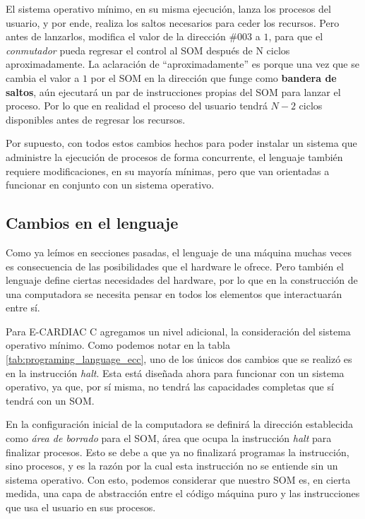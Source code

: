 \documentclass[letterpaper,12pt,oneside]{book}
\begin{document}
		El sistema operativo mínimo, en su misma ejecución, lanza los procesos del usuario, y por ende, realiza los saltos necesarios para ceder los recursos. Pero antes de lanzarlos,		
		modifica el valor de la dirección $\#003$ a $1$, para que el \textit{conmutador} pueda regresar el control al SOM después de N ciclos aproximadamente. La aclaración de ``aproximadamente'' es porque
		una vez que se cambia el valor a $1$ por el SOM en la dirección que funge como \textbf{bandera de saltos}, aún ejecutará un par de instrucciones propias
		del SOM para lanzar el proceso. Por lo que en realidad el proceso del usuario tendrá $N-2$ ciclos disponibles antes de regresar los recursos.
		
		Por supuesto, con todos estos cambios hechos para poder instalar un sistema que administre la ejecución de procesos de forma concurrente, el lenguaje también
		requiere modificaciones, en su mayoría mínimas, pero que van orientadas a funcionar en conjunto con un sistema operativo.
		
		\subsection{Cambios en el lenguaje}
		
		Como ya leímos en secciones pasadas, el lenguaje de una máquina muchas veces es consecuencia de las posibilidades que el hardware le ofrece. 
		Pero
		también el lenguaje define ciertas necesidades del hardware, por lo que en la construcción de una computadora se necesita pensar en todos
		los elementos que interactuarán entre sí. 
  
        Para E-CARDIAC C agregamos un nivel adicional, la consideración del sistema operativo mínimo. Como
		podemos notar en la tabla \ref{tab:programing_language_ecc}, uno de los únicos dos cambios que se realizó es en la instrucción \textit{halt}. Esta está diseñada ahora para funcionar con un sistema operativo, ya que, por sí misma, no tendrá las capacidades completas que sí tendrá con un SOM.
        
        En la configuración inicial de la computadora se definirá la dirección  establecida como \textit{área de borrado} para el SOM, área que ocupa la instrucción \textit{halt} para finalizar procesos. Esto se debe a que ya no finalizará programas la instrucción, sino procesos, y es la razón por la cual
        esta instrucción no se entiende sin un sistema operativo. Con esto,
		podemos considerar que nuestro SOM es, en cierta medida, una capa de abstracción entre el código máquina puro y las instrucciones que usa el usuario en sus procesos.
\end{document}
